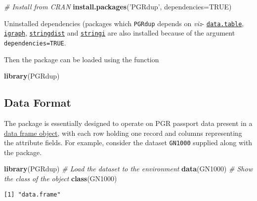 \documentclass[
]{article}
\newenvironment{Shaded}{\begin{snugshade}}{\end{snugshade}}
\newcommand{\CommentTok}[1]{\textcolor[rgb]{0.56,0.35,0.01}{\textit{#1}}}
\newcommand{\DataTypeTok}[1]{\textcolor[rgb]{0.13,0.29,0.53}{#1}}
\newcommand{\KeywordTok}[1]{\textcolor[rgb]{0.13,0.29,0.53}{\textbf{#1}}}
\newcommand{\NormalTok}[1]{#1}
\newcommand{\OtherTok}[1]{\textcolor[rgb]{0.56,0.35,0.01}{#1}}
\newcommand{\StringTok}[1]{\textcolor[rgb]{0.31,0.60,0.02}{#1}}
\begin{document}
\begin{Shaded}
\begin{Highlighting}[]
\CommentTok{# Install from CRAN}
\KeywordTok{install.packages}\NormalTok{(}\StringTok{'PGRdup'}\NormalTok{, }\DataTypeTok{dependencies=}\OtherTok{TRUE}\NormalTok{)}
\end{Highlighting}
\end{Shaded}

Uninstalled dependencies (packages which \texttt{PGRdup} depends on
\emph{viz}-
\href{https://CRAN.R-project.org/package=data.table}{\texttt{data.table}},
\href{https://CRAN.R-project.org/package=igraph}{\texttt{igraph}},
\href{https://CRAN.R-project.org/package=stringdist}{\texttt{stringdist}}
and \href{https://CRAN.R-project.org/package=stringi}{\texttt{stringi}}
are also installed because of the argument \texttt{dependencies=TRUE}.

Then the package can be loaded using the function

\begin{Shaded}
\begin{Highlighting}[]
\KeywordTok{library}\NormalTok{(PGRdup)}
\end{Highlighting}
\end{Shaded}

\hypertarget{data-format}{%
\subsection{Data Format}\label{data-format}}

The package is essentially designed to operate on PGR passport data
present in a \href{http://google.com/\#q=\%5BR\%5D+data.frame}{data
frame object}, with each row holding one record and columns representing
the attribute fields. For example, consider the dataset \texttt{GN1000}
supplied along with the package.

\begin{Shaded}
\begin{Highlighting}[]
\KeywordTok{library}\NormalTok{(PGRdup)}
\CommentTok{# Load the dataset to the environment}
\KeywordTok{data}\NormalTok{(GN1000)}
\CommentTok{# Show the class of the object}
\KeywordTok{class}\NormalTok{(GN1000)}
\end{Highlighting}
\end{Shaded}

\begin{verbatim}
[1] "data.frame"
\end{verbatim}
\end{document}
